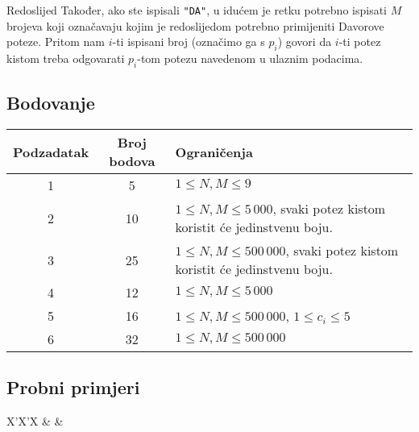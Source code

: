 \begin{statement}[
  problempoints=100,
  timelimit=1 sekunda,
  memorylimit=512 MiB,
]{Redoslijed}
Također, ako ste ispisali \texttt{"DA"}, u idućem je retku potrebno ispisati
$M$ brojeva koji označavaju kojim je redoslijedom potrebno primijeniti Davorove
poteze. Pritom nam $i$-ti ispisani broj (označimo ga s $p_i$) govori da $i$-ti
potez kistom treba odgovarati $p_i$-tom potezu navedenom u ulaznim podacima.

\subsection*{Bodovanje}
{\renewcommand{\arraystretch}{1.4}
  \setlength{\tabcolsep}{6pt}
  \begin{tabular}{ccl}
 Podzadatak & Broj bodova & Ograničenja \\ \midrule
  1 & 5 & $1 \le N, M \le 9$ \\
  2 & 10 & $1 \le N, M \le 5\,000$, svaki potez kistom koristit će jedinstvenu boju. \\
  3 & 25 & $1 \le N, M \le 500\,000$, svaki potez kistom koristit će jedinstvenu boju. \\
  4 & 12 & $1 \le N, M \le 5\,000$ \\
  5 & 16 & $1 \le N, M \le 500\,000$, $1 \le c_i \le 5$\\
  6 & 32 & $1 \le N, M \le 500\,000$ \\
\end{tabular}}

\subsection*{Probni primjeri}
\begin{tabularx}{\textwidth}{X'X'X}
 &
 &
\end{tabularx}


\end{statement}

